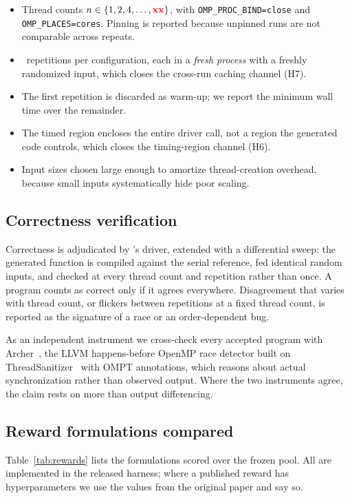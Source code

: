 \begin{itemize}
  \item Thread counts $n \in \{1,2,4,\dots,\textcolor{red}{\textbf{xx}}\}$, with
  \texttt{OMP\_PROC\_BIND=close} and \texttt{OMP\_PLACES=cores}. Pinning is
  reported because unpinned runs are not comparable across repeats.
  \item \NRepeats\ repetitions per configuration, each in a \emph{fresh
  process} with a freshly randomized input, which closes the cross-run caching
  channel (H7).
  \item The first repetition is discarded as warm-up; we report the minimum
  wall time over the remainder.
  \item The timed region encloses the entire driver call, not a region the
  generated code controls, which closes the timing-region channel (H6).
  \item Input sizes chosen large enough to amortize thread-creation overhead,
  because small inputs systematically hide poor scaling.
\end{itemize}

\subsection{Correctness verification}

Correctness is adjudicated by \ParEval's driver, extended with a differential
sweep: the generated function is compiled against the serial reference, fed
identical random inputs, and checked at every thread count and repetition
rather than once. A program counts as correct only if it agrees everywhere.
Disagreement that varies with thread count, or flickers between repetitions at
a fixed thread count, is reported as the signature of a race or an
order-dependent bug.

As an independent instrument we cross-check every accepted program with
Archer~\cite{archer}, the LLVM happens-before OpenMP race detector built on
ThreadSanitizer~\cite{tsan} with OMPT annotations, which reasons about actual
synchronization rather than observed output. Where the two instruments agree,
the claim rests on more than output differencing.

\subsection{Reward formulations compared}

Table~\ref{tab:rewards} lists the formulations scored over the frozen pool. All
are implemented in the released harness; where a published reward has
hyperparameters we use the values from the original paper and say so.

